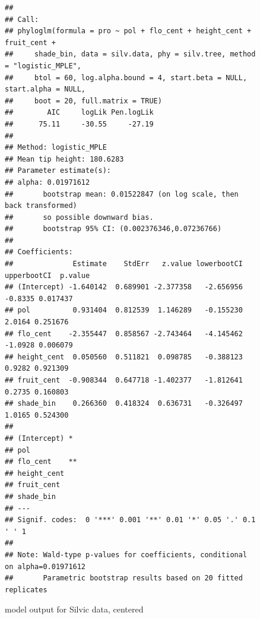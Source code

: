 \documentclass{article}\usepackage[]{graphicx}\usepackage[]{color}
\makeatletter
\newenvironment{kframe}{%
 \def\at@end@of@kframe{}%
 \ifinner\ifhmode%
  \def\at@end@of@kframe{\end{minipage}}%
  \begin{minipage}{\columnwidth}%
 \fi\fi%
 \def\FrameCommand##1{\hskip\@totalleftmargin \hskip-\fboxsep
 \colorbox{shadecolor}{##1}\hskip-\fboxsep
     \hskip-\linewidth \hskip-\@totalleftmargin \hskip\columnwidth}%
 \MakeFramed {\advance\hsize-\width
   \@totalleftmargin\z@ \linewidth\hsize
   \@setminipage}}%
 {\par\unskip\endMakeFramed%
 \at@end@of@kframe}
\newenvironment{knitrout}{}{} %
\makeatother
\begin{document}
\begin{figure}[h!]
\begin{knitrout}
\color{fgcolor}\begin{kframe}
\begin{verbatim}
## 
## Call:
## phyloglm(formula = pro ~ pol + flo_cent + height_cent + fruit_cent + 
##     shade_bin, data = silv.data, phy = silv.tree, method = "logistic_MPLE", 
##     btol = 60, log.alpha.bound = 4, start.beta = NULL, start.alpha = NULL, 
##     boot = 20, full.matrix = TRUE)
##        AIC     logLik Pen.logLik 
##      75.11     -30.55     -27.19 
## 
## Method: logistic_MPLE
## Mean tip height: 180.6283
## Parameter estimate(s):
## alpha: 0.01971612 
##       bootstrap mean: 0.01522847 (on log scale, then back transformed)
##       so possible downward bias.
##       bootstrap 95% CI: (0.002376346,0.07236766)
## 
## Coefficients:
##              Estimate    StdErr   z.value lowerbootCI upperbootCI  p.value
## (Intercept) -1.640142  0.689901 -2.377358   -2.656956     -0.8335 0.017437
## pol          0.931404  0.812539  1.146289   -0.155230      2.0164 0.251676
## flo_cent    -2.355447  0.858567 -2.743464   -4.145462     -1.0928 0.006079
## height_cent  0.050560  0.511821  0.098785   -0.388123      0.9282 0.921309
## fruit_cent  -0.908344  0.647718 -1.402377   -1.812641      0.2735 0.160803
## shade_bin    0.266360  0.418324  0.636731   -0.326497      1.0165 0.524300
##               
## (Intercept) * 
## pol           
## flo_cent    **
## height_cent   
## fruit_cent    
## shade_bin     
## ---
## Signif. codes:  0 '***' 0.001 '**' 0.01 '*' 0.05 '.' 0.1 ' ' 1
## 
## Note: Wald-type p-values for coefficients, conditional on alpha=0.01971612
##       Parametric bootstrap results based on 20 fitted replicates
\end{verbatim}
\end{kframe}
\end{knitrout}
\caption{model output for Silvic data, centered}
\end{figure}
\end{document}
